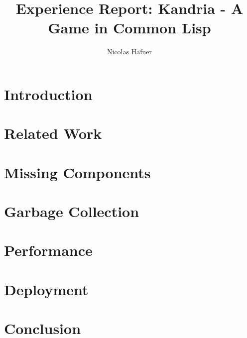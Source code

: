 \documentclass[format=sigconf]{acmart}
\begin{document}
\title{Experience Report: Kandria - A Game in Common Lisp}

\author{Nicolas Hafner}

\begin{abstract}
  
\end{abstract}

\begin{CCSXML}
  
\end{CCSXML}


\maketitle

\def\abovecaptionskip{1pt}
\def\listingautorefname{Listing}
\def\figureautorefname{Figure}

\section{Introduction}\label{introduction}

\section{Related Work}\label{relatedwork}

\section{Missing Components}\label{yaks}

\section{Garbage Collection}\label{gc}

\section{Performance}\label{performance}

\section{Deployment}\label{deployment}

\section{Conclusion}\label{conclusion}
\end{document}
